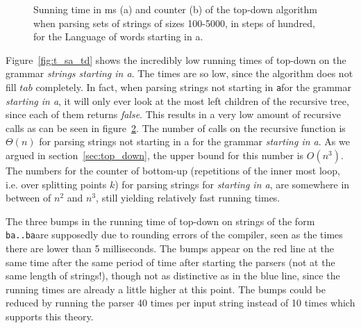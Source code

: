 \begin{figure}[!ht]
\begin{subfigure}[b]{0.48\textwidth}
        \caption{}
        \label{fig:c_sa_td}
    \end{subfigure}
    \caption{Sunning time in ms (a) and counter (b) of the top-down algorithm when parsing sets of strings of sizes 100-5000, in steps of hundred, for the Language of words starting in a.}
\end{figure}

Figure~\ref{fig:t_sa_td} shows the incredibly low running times of top-down on the grammar \textit{strings starting in a}.
The times are so low, since the algorithm does not fill $tab$ completely.
In fact, when parsing strings not starting in \texttt{a}for the grammar \textit{starting in a}, it will only ever look at the most left children of the recursive tree, since each of them returns \textit{false}.
This results in a very low amount of recursive calls as can be seen in figure~\ref{fig:c_sa_td}.
The number of calls on the recursive function is $\Theta(n)$ for parsing strings not starting in a for the grammar \textit{starting in a}.
As we argued in section~\ref{sec:top_down}, the upper bound for this number is $O(n^3)$.
The numbers for the counter of bottom-up (repetitions of the inner most loop, i.e. over splitting points $k$) for parsing strings for \textit{starting in a}, are somewhere in between of $n^2$ and $n^3$, still yielding relatively fast running times.

The three bumps in the running time of top-down on strings of the form \texttt{ba..ba}are supposedly due to rounding errors of the compiler, seen as the times there are lower than 5 milliseconds.
The bumps appear on the red line at the same time after the same period of time after starting the parsers (not at the same length of strings!), though not as distinctive as in the blue line, since the running times are already a little higher at this point.
The bumps could be reduced by running the parser 40 times per input string instead of 10 times which supports this theory.

